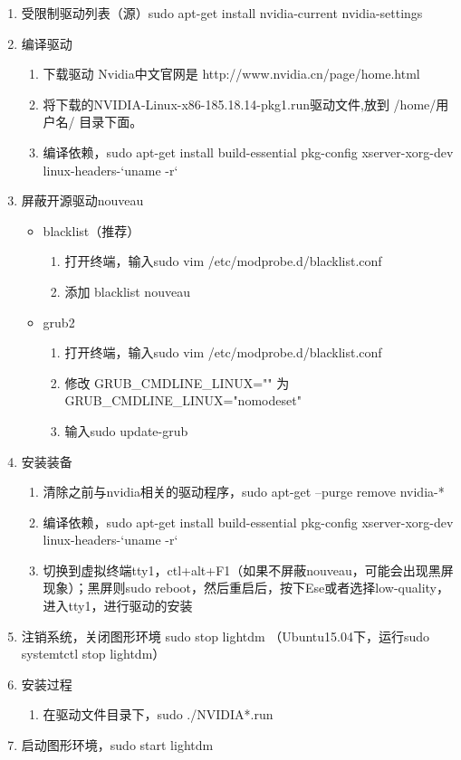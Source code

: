 \begin{enumerate}
\item 受限制驱动列表（源）sudo apt-get install nvidia-current nvidia-settings
\item 编译驱动
	\begin{enumerate}
	\item 下载驱动 Nvidia中文官网是 http://www.nvidia.cn/page/home.html
	\item 将下载的NVIDIA-Linux-x86-185.18.14-pkg1.run驱动文件,放到 /home/用户名/ 目录下面。
	\item 编译依赖，sudo apt-get install build-essential pkg-config xserver-xorg-dev linux-headers-`uname -r`
	\end{enumerate}
\item 屏蔽开源驱动nouveau
	\begin{itemize}
	\item blacklist（推荐）
	    \begin{enumerate}
	    \item 打开终端，输入sudo vim /etc/modprobe.d/blacklist.conf
	    \item 添加 blacklist nouveau
	    \end{enumerate}
	\item grub2
	    \begin{enumerate}
	    \item 打开终端，输入sudo vim /etc/modprobe.d/blacklist.conf
	    \item 修改 GRUB\_CMDLINE\_LINUX="" 为 GRUB\_CMDLINE\_LINUX="nomodeset" 
	    \item 输入sudo update-grub
	    \end{enumerate}	
	\end{itemize}
\item 安装装备
	\begin{enumerate}
	\item 清除之前与nvidia相关的驱动程序，sudo apt-get --purge remove nvidia-*  
	\item 编译依赖，sudo apt-get install build-essential pkg-config xserver-xorg-dev linux-headers-`uname -r`
	\item 切换到虚拟终端tty1，ctl+alt+F1（如果不屏蔽nouveau，可能会出现黑屏现象）；黑屏则sudo reboot，然后重启后，按下Ese或者选择low-quality，进入tty1，进行驱动的安装
	\end{enumerate}
\item 注销系统，关闭图形环境  sudo stop lightdm （Ubuntu15.04下，运行sudo systemtctl stop lightdm）
\item 安装过程 
	\begin{enumerate}
	\item 在驱动文件目录下，sudo ./NVIDIA*.run
	\end{enumerate}
\item 启动图形环境，sudo start lightdm
\end{enumerate}

